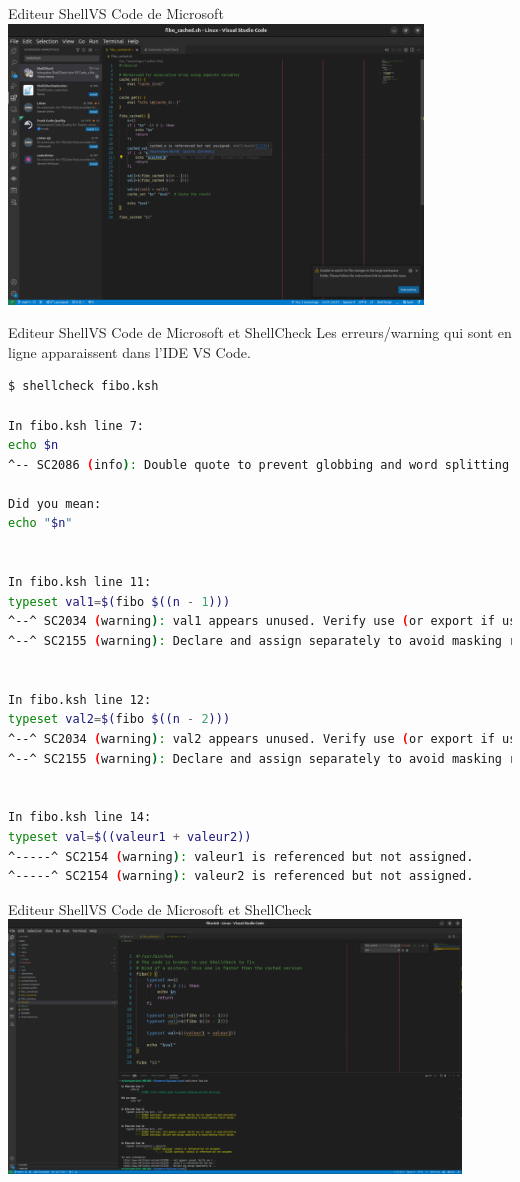 \documentclass{beamer}
\begin{document}
    \begin{frame}{Editeur Shell}{VS Code de Microsoft}
        \centering
        \includegraphics[width=11cm]{image/shellcheck-install}
    \end{frame}

    \begin{frame}[fragile]{Editeur Shell}{VS Code de Microsoft et ShellCheck}
        Les erreurs/warning qui sont en ligne apparaissent dans l'IDE VS Code.
        \begin{lstlisting}[language=bash,basicstyle=\tiny\ttfamily]
$ shellcheck fibo.ksh

In fibo.ksh line 7:
echo $n
^-- SC2086 (info): Double quote to prevent globbing and word splitting.

Did you mean:
echo "$n"


In fibo.ksh line 11:
typeset val1=$(fibo $((n - 1)))
^--^ SC2034 (warning): val1 appears unused. Verify use (or export if used externally).
^--^ SC2155 (warning): Declare and assign separately to avoid masking return values.


In fibo.ksh line 12:
typeset val2=$(fibo $((n - 2)))
^--^ SC2034 (warning): val2 appears unused. Verify use (or export if used externally).
^--^ SC2155 (warning): Declare and assign separately to avoid masking return values.


In fibo.ksh line 14:
typeset val=$((valeur1 + valeur2))
^-----^ SC2154 (warning): valeur1 is referenced but not assigned.
^-----^ SC2154 (warning): valeur2 is referenced but not assigned.
        \end{lstlisting}
    \end{frame}

    \begin{frame}{Editeur Shell}{VS Code de Microsoft et ShellCheck}
        \centering
        \includegraphics[width=12cm]{image/shellcheck-warning}
    \end{frame}
\end{document}
